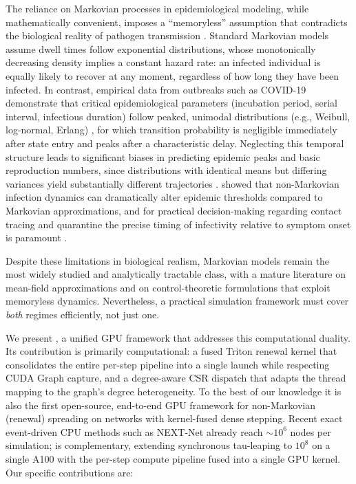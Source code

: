 The reliance on Markovian processes in epidemiological modeling, while mathematically convenient, imposes a ``memoryless'' assumption that contradicts the biological reality of pathogen transmission \citep{vajdi2023non}. Standard Markovian models assume dwell times follow exponential distributions, whose monotonically decreasing density implies a constant hazard rate: an infected individual is equally likely to recover at any moment, regardless of how long they have been infected. In contrast, empirical data from outbreaks such as COVID-19 demonstrate that critical epidemiological parameters (incubation period, serial interval, infectious duration) follow peaked, unimodal distributions (e.g., Weibull, log-normal, Erlang) \citep{sanche2020high, backer2020incubation, lauer2020incubation}, for which transition probability is negligible immediately after state entry and peaks after a characteristic delay. Neglecting this temporal structure leads to significant biases in predicting epidemic peaks and basic reproduction numbers, since distributions with identical means but differing variances yield substantially different trajectories \citep{vajdi2023non, sherborne2018mean, feng2019equivalence}. \citet{van2013non} showed that non-Markovian infection dynamics can dramatically alter epidemic thresholds compared to Markovian approximations, and for practical decision-making regarding contact tracing and quarantine the precise timing of infectivity relative to symptom onset is paramount \citep{vajdi2023non, he2020temporal}.

Despite these limitations in biological realism, Markovian models remain the most widely studied and analytically tractable class, with a mature literature on mean-field approximations \citep{keeling2005networks, kiss2017mathematics} and on control-theoretic formulations \citep{nowzari2016analysis, watkins2019robust, preciado2014optimal} that exploit memoryless dynamics. Nevertheless, a practical simulation framework must cover \emph{both} regimes efficiently, not just one.

We present \flashspread{}, a unified GPU framework that addresses this computational duality. Its contribution is primarily computational: a fused Triton renewal kernel that consolidates the entire per-step pipeline into a single launch while respecting CUDA Graph capture, and a degree-aware CSR dispatch that adapts the thread mapping to the graph's degree heterogeneity. To the best of our knowledge it is also the first open-source, end-to-end GPU framework for non-Markovian (renewal) spreading on networks with kernel-fused dense stepping. Recent exact event-driven CPU methods such as NEXT-Net \citep{cure2025fast} already reach $\sim$$10^6$ nodes per simulation; \flashspread{} is complementary, extending synchronous tau-leaping to $10^8$ on a single A100 with the per-step compute pipeline fused into a single GPU kernel. Our specific contributions are:

